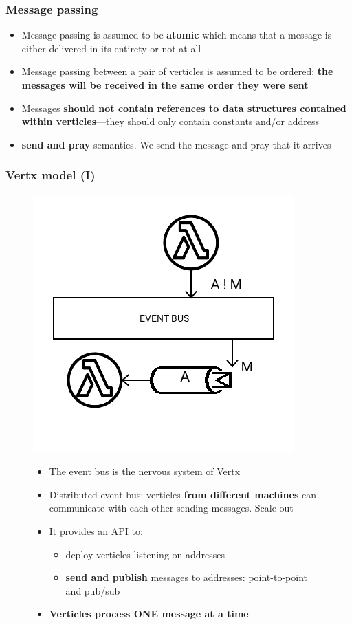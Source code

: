 \documentclass{beamer}
\begin{document}
\begin{frame}
\frametitle{Message passing}
\begin{itemize}
\item<1-> Message passing is assumed to be \textbf{atomic} which means that a message is either delivered in its entirety or not at all
\item<2-> Message passing between a pair of verticles is assumed to be ordered: \textbf{the messages will be received in the same order they were sent}
\item<3-> Messages \textbf{should not contain references to data structures contained within verticles}—they should only contain constants and/or address
\item<4->\textbf{send and pray} semantics. We send the message and pray that it arrives
\end{itemize}
\end{frame}

\begin{frame}
\frametitle{Vertx model (I)}
\begin{figure}
\includegraphics[scale=0.3]{images/vertx-model-1.png}
\begin{itemize}
\item<1-> The event bus  is the nervous system of Vertx
\item<2-> Distributed event bus: verticles \textbf{from different machines} can communicate with each other sending messages. Scale-out
\item<3-> It provides an API to:
\begin{itemize}
        \item<4-> deploy verticles listening on addresses
        \item<5-> \textbf{send and publish} messages to addresses: point-to-point and pub/sub 
\end{itemize}        
\item<6->  \textbf{Verticles process ONE message at a time}
\end{itemize}
\end{figure}
\end{frame}
\end{document}
